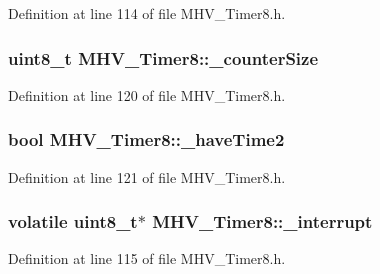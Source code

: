 \-Definition at line 114 of file \-M\-H\-V\-\_\-\-Timer8.\-h.

\hypertarget{class_m_h_v___timer8_a25827d35452ab31f1f0e1beb232a259b}{
\subsubsection[{\-\_\-counter\-Size}]{\setlength{\rightskip}{0pt plus 5cm}uint8\-\_\-t {\bf \-M\-H\-V\-\_\-\-Timer8\-::\-\_\-counter\-Size}}}
\label{class_m_h_v___timer8_a25827d35452ab31f1f0e1beb232a259b}


\-Definition at line 120 of file \-M\-H\-V\-\_\-\-Timer8.\-h.

\hypertarget{class_m_h_v___timer8_adffeb4bbdd699814b5d0abd9cf59b3a9}{
\subsubsection[{\-\_\-have\-Time2}]{\setlength{\rightskip}{0pt plus 5cm}bool {\bf \-M\-H\-V\-\_\-\-Timer8\-::\-\_\-have\-Time2}}}
\label{class_m_h_v___timer8_adffeb4bbdd699814b5d0abd9cf59b3a9}


\-Definition at line 121 of file \-M\-H\-V\-\_\-\-Timer8.\-h.

\hypertarget{class_m_h_v___timer8_a98e41d7d3ceef4b8fce11644ea110ee9}{
\subsubsection[{\-\_\-interrupt}]{\setlength{\rightskip}{0pt plus 5cm}volatile uint8\-\_\-t$\ast$ {\bf \-M\-H\-V\-\_\-\-Timer8\-::\-\_\-interrupt}}}
\label{class_m_h_v___timer8_a98e41d7d3ceef4b8fce11644ea110ee9}


\-Definition at line 115 of file \-M\-H\-V\-\_\-\-Timer8.\-h.

